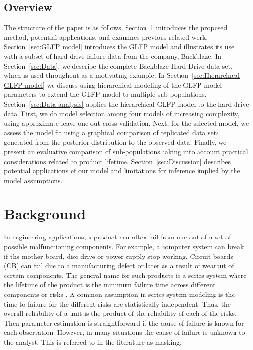 \documentclass[12pt]{article}
\begin{document}
\subsection{Overview}
The structure of the paper is as follows. Section~\ref{sec:Background} introduces the proposed method, potential applications, and examines previous related work.  Section~\ref{sec:GLFP model} introduces the GLFP model and illustrates its use with a subset of hard drive failure data from the company, Backblaze.  In Section~\ref{sec:Data}, we describe the complete Backblaze Hard Drive data set, which is used throughout as a motivating example. In Section~\ref{sec:Hierarchical GLFP model} we discuss using hierarchical modeling of the GLFP model parameters to extend the GLFP model to multiple sub-populations. Section~\ref{sec:Data analysis} applies the hierarchical GLFP model to the hard drive data. First, we do model selection among four models of increasing complexity, using approximate leave-one-out cross-validation. Next, for the selected model, we assess the model fit using a graphical comparison of replicated data sets generated from the posterior distribution to the observed data. Finally, we present an evaluative comparison of sub-populations taking into account practical considerations related to product lifetime. Section~\ref{sec:Discussion} describes potential applications of our model and limitations for inference implied by the model assumptions.

\section{Background}
\label{sec:Background}
In engineering applications, a product can often fail from one out of a set of possible malfunctioning components.  For example, a computer system can break if the mother board, disc drive or power supply stop working.  Circuit boards (CB) can fail due to a manufacturing defect or later as a result of wearout of certain components.  The general name for such products is a series system where the lifetime of the product is the minimum failure time across different components or risks \citep[Chapter 5]{nelson}.  A common assumption in series system modeling is the time to failure for the different risks are statistically independent.  Thus, the overall reliability of a unit is the product of the reliability of each of the risks.  Then parameter estimation is straightforward if the cause of failure is known for each observation.  However, in many situations the cause of failure is unknown to the analyst. This is referred to in the literature as masking.
\end{document}
